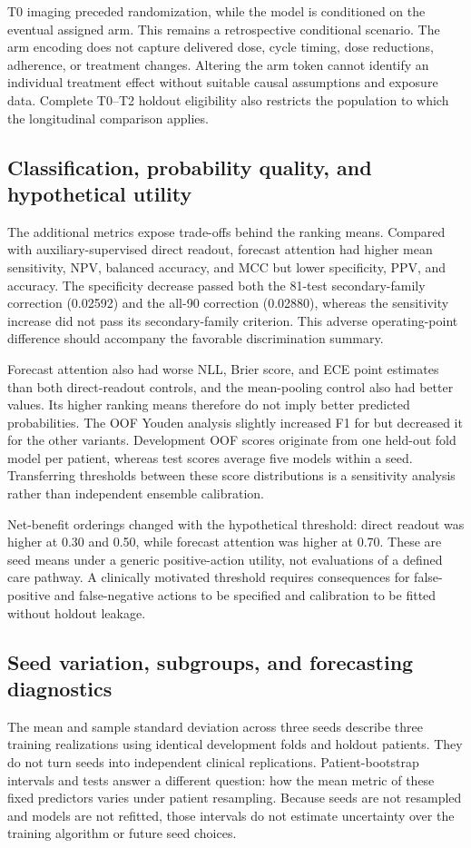 T0 imaging preceded randomization, while the model is conditioned on the eventual assigned arm. This remains a retrospective conditional scenario. The arm encoding does not capture delivered dose, cycle timing, dose reductions, adherence, or treatment changes. Altering the arm token cannot identify an individual treatment effect without suitable causal assumptions and exposure data. Complete T0--T2 holdout eligibility also restricts the population to which the longitudinal comparison applies.

\subsection{Classification, probability quality, and hypothetical utility}
The additional metrics expose trade-offs behind the ranking means. Compared with auxiliary-supervised direct readout, forecast attention had higher mean sensitivity, NPV, balanced accuracy, and MCC but lower specificity, PPV, and accuracy. The specificity decrease passed both the 81-test secondary-family correction (0.02592) and the all-90 correction (0.02880), whereas the sensitivity increase did not pass its secondary-family criterion. This adverse operating-point difference should accompany the favorable discrimination summary.

Forecast attention also had worse NLL, Brier score, and ECE point estimates than both direct-readout controls, and the mean-pooling control also had better values. Its higher ranking means therefore do not imply better predicted probabilities. The OOF Youden analysis slightly increased F1 for \nojepa{} but decreased it for the other variants. Development OOF scores originate from one held-out fold model per patient, whereas test scores average five models within a seed. Transferring thresholds between these score distributions is a sensitivity analysis rather than independent ensemble calibration.

Net-benefit orderings changed with the hypothetical threshold: direct readout was higher at 0.30 and 0.50, while forecast attention was higher at 0.70. These are seed means under a generic positive-action utility, not evaluations of a defined care pathway. A clinically motivated threshold requires consequences for false-positive and false-negative actions to be specified and calibration to be fitted without holdout leakage.

\subsection{Seed variation, subgroups, and forecasting diagnostics}
The mean and sample standard deviation across three seeds describe three training realizations using identical development folds and holdout patients. They do not turn seeds into independent clinical replications. Patient-bootstrap intervals and tests answer a different question: how the mean metric of these fixed predictors varies under patient resampling. Because seeds are not resampled and models are not refitted, those intervals do not estimate uncertainty over the training algorithm or future seed choices.

